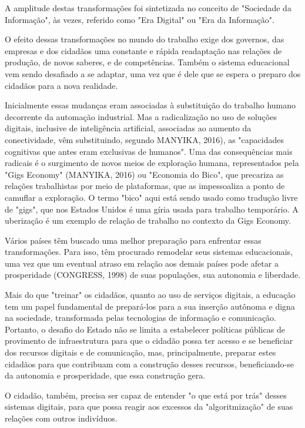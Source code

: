 A amplitude destas transformações foi sintetizada no conceito de "Sociedade da Informação", às vezes, referido como "Era Digital" ou "Era da Informação".

O efeito dessas transformações no mundo do trabalho exige dos governos, das empresas e dos cidadãos uma constante e rápida readaptação  nas relações de produção, de novos saberes, e de  competências. Também o sistema educacional vem sendo desafiado a se adaptar, uma vez que é dele que se espera o preparo dos cidadãos para a nova realidade.

Inicialmente essas mudanças eram associadas à substituição do trabalho humano decorrente da automação industrial. Mas a radicalização no uso de soluções digitais, inclusive de inteligência artificial, associadas ao aumento da conectividade, vêm substituindo, segundo MANYIKA, 2016), as "capacidades cognitivas que antes eram exclusivas de humanos". Uma das consequências mais radicais é o surgimento de novos meios de exploração humana, representados pela "Gigs Economy" (MANYIKA, 2016) ou "Economia do Bico", que precariza as relações trabalhistas por meio de plataformas, que as impessoaliza a ponto de camuflar a exploração. O termo "bico" aqui está sendo usado como tradução livre de "gigs", que nos Estados Unidos é uma gíria usada para trabalho temporário. A uberização é um exemplo de relação de trabalho no contexto da Gigs Economy.

Vários países têm buscado uma melhor preparação para enfrentar essas transformações. Para isso, têm procurado remodelar seus sistemas educacionais, uma vez que um eventual atraso em relação aos demais países pode afetar a prosperidade (CONGRESS, 1998) de suas populações, sua autonomia e liberdade.

Mais do que "treinar" os cidadãos, quanto ao uso  de serviços digitais, a educação tem um papel fundamental de prepará-los para a sua inserção autônoma e digna na sociedade, transformada pelas tecnologias de informação e comunicação. Portanto, o desafio do Estado não se limita a estabelecer políticas públicas de provimento de infraestrutura para que o cidadão possa ter acesso e se beneficiar dos recursos digitais e de comunicação, mas, principalmente, preparar estes cidadãos para que contribuam com a construção desses recursos, beneficiando-se da autonomia e prosperidade, que  essa construção gera.

O cidadão, também, precisa ser capaz de entender "o que está por trás" desses sistemas digitais, para que possa reagir aos excessos da "algoritmização" de suas relações com outros indivíduos.

